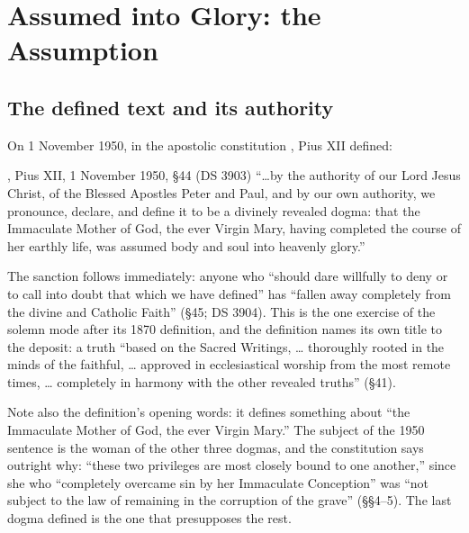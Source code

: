\sectionguard
\section{Assumed into Glory: the Assumption}

\subsection*{The defined text and its authority}

On 1 November 1950, in the apostolic constitution , Pius XII defined:

\begin{definedtext}{, Pius XII, 1 November
1950, \S44 (DS 3903)}
``\ldots{}by the authority of our Lord Jesus Christ, of the Blessed
Apostles Peter and Paul, and by our own authority, we pronounce, declare,
and define it to be a divinely revealed dogma: that the Immaculate Mother
of God, the ever Virgin Mary, having completed the course of her earthly
life, was assumed body and soul into heavenly
glory.''
\end{definedtext}

The sanction follows immediately: anyone who ``should dare willfully to
deny or to call into doubt that which we have defined'' has ``fallen away
completely from the divine and Catholic Faith'' (\S45; DS
3904). This is the one exercise of the solemn
 mode after its 1870 definition, and the definition
names its own title to the deposit: a truth ``based on the Sacred
Writings, \ldots{} thoroughly rooted in the minds of the faithful,
\ldots{} approved in ecclesiastical worship from the most remote times,
\ldots{} completely in harmony with the other revealed truths'' (\S41).

Note also the definition's opening words: it defines something about
``the Immaculate Mother of God, the ever Virgin Mary.'' The subject of
the 1950 sentence is the woman of the other three dogmas, and the
constitution says outright why: ``these two privileges are most closely
bound to one another,'' since she who ``completely overcame sin by her
Immaculate Conception'' was ``not subject to the law of remaining in the
corruption of the grave'' (\S\S4--5). The last dogma defined is the one
that presupposes the rest.

